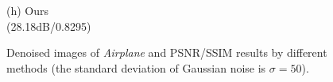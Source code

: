\documentclass[runningheads]{llncs}
\begin{document}
\begin{figure}
{\begin{minipage}[t]{0.244\textwidth}
{\footnotesize (h) Ours \\(28.18dB/0.8295)}
\end{minipage}
}
\caption{Denoised images of \textsl{Airplane} and PSNR/SSIM results by different methods (the standard deviation of Gaussian noise is $\sigma=50$).}
\label{fig6}
\end{figure}

\begin{figure}
\centering
{}
\end{figure}
\end{document}
